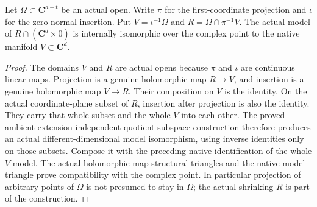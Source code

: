 \begin{theorem}
\label{hir:actual-analytic-coordinate-plane-native-manifold}
\leanok
Let $\Omega\subset\mathbf C^{d+t}$ be an actual open. Write $\pi$ for the
first-coordinate projection and $\iota$ for the zero-normal insertion.
Put $V=\iota^{-1}\Omega$ and $R=\Omega\cap\pi^{-1}V$. The actual model
of $R\cap(\mathbf C^d\times0)$ is internally isomorphic over the complex
point to the native manifold $V\subset\mathbf C^d$.
\end{theorem}
\begin{proof}
The domains $V$ and $R$ are actual opens because $\pi$ and $\iota$ are
continuous linear maps. Projection is a genuine holomorphic map
$R\to V$, and insertion is a genuine holomorphic map $V\to R$.
Their composition on $V$ is the identity. On the actual coordinate-plane
subset of $R$, insertion after projection is also the identity. They
carry that whole subset and the whole $V$ into each other. The proved
ambient-extension-independent quotient-subspace construction therefore
produces an actual different-dimensional model isomorphism, using
inverse identities only on those subsets. Compose it with the preceding
native identification of the whole $V$ model. The actual holomorphic
map structural triangles and the native-model triangle prove compatibility
with the complex point. In particular projection of arbitrary points of
$\Omega$ is not presumed to stay in $\Omega$; the actual shrinking $R$
is part of the construction.
\end{proof}

